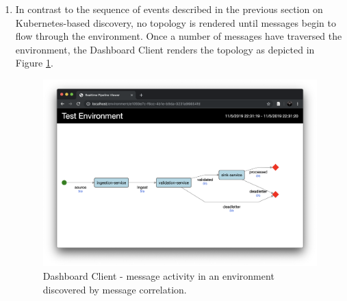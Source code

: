 \begin{enumerate}
	\item In contrast to the sequence of events described in the previous section on Kubernetes-based discovery, no topology is rendered until messages begin to flow through the environment. Once a number of messages have traversed the environment, the Dashboard Client renders the topology as depicted in Figure  \ref{activity_env_correlation}.

\begin{figure}[H]
	\centering  
	\includegraphics[scale=0.4]{figures/walkthrough/correlation_env_activity.png}
	\caption{Dashboard Client - message activity in an environment discovered by message correlation.}
	\label{activity_env_correlation}
\end{figure}


\end{enumerate}